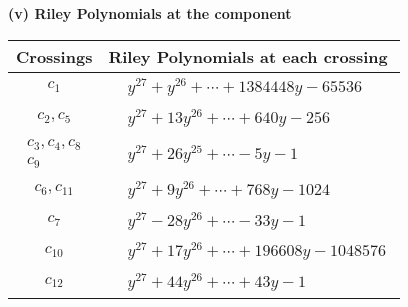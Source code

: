 \documentclass[1p]{elsarticle_modified}
\theoremstyle{definition}
\begin{document}
\newpage\renewcommand{\arraystretch}{1}
\flushleft \textbf{(v) Riley Polynomials at the component}\newline \\
\begin{tabular}{m{50pt}|m{274pt}}
Crossings & \hspace{64pt}Riley Polynomials at each crossing \\
\hline $$\begin{aligned}c_{1}\end{aligned}$$&$\begin{aligned}
&y^{27}+y^{26}+\cdots+1384448 y-65536
\end{aligned}$\\
\hline $$\begin{aligned}c_{2},c_{5}\end{aligned}$$&$\begin{aligned}
&y^{27}+13 y^{26}+\cdots+640 y-256
\end{aligned}$\\
\hline $$\begin{aligned}c_{3},c_{4},c_{8}\\c_{9}\end{aligned}$$&$\begin{aligned}
&y^{27}+26 y^{25}+\cdots-5 y-1
\end{aligned}$\\
\hline $$\begin{aligned}c_{6},c_{11}\end{aligned}$$&$\begin{aligned}
&y^{27}+9 y^{26}+\cdots+768 y-1024
\end{aligned}$\\
\hline $$\begin{aligned}c_{7}\end{aligned}$$&$\begin{aligned}
&y^{27}-28 y^{26}+\cdots-33 y-1
\end{aligned}$\\
\hline $$\begin{aligned}c_{10}\end{aligned}$$&$\begin{aligned}
&y^{27}+17 y^{26}+\cdots+196608 y-1048576
\end{aligned}$\\
\hline $$\begin{aligned}c_{12}\end{aligned}$$&$\begin{aligned}
&y^{27}+44 y^{26}+\cdots+43 y-1
\end{aligned}$\\
\hline
\end{tabular}\\~\\
\end{document}
